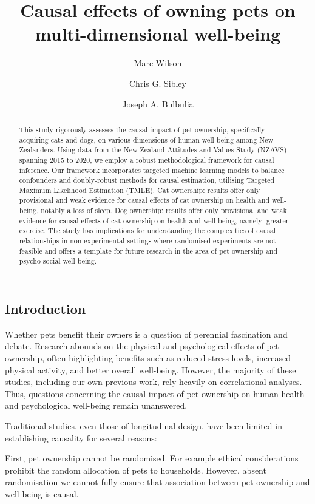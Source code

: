 \documentclass[
  singlecolumn,
  9pt]{article}
\title{Causal effects of owning pets on multi-dimensional well-being}
\author{Marc Wilson}
\affil{%
                  Victoria University of Wellington, New Zealand
              }
\author{Chris G. Sibley}
\affil{%
                  School of Psychology, University of Auckland
              }
\author{Joseph A. Bulbulia}
\affil{%
                  Victoria University of Wellington, New Zealand
              }
\date{}
\begin{document}
\maketitle
\begin{abstract}
This study rigorously assesses the causal impact of pet ownership,
specifically acquiring cats and dogs, on various dimensions of human
well-being among New Zealanders. Using data from the New Zealand
Attitudes and Values Study (NZAVS) spanning 2015 to 2020, we employ a
robust methodological framework for causal inference. Our framework
incorporates targeted machine learning models to balance confounders and
doubly-robust methods for causal estimation, utilising Targeted Maximum
Likelihood Estimation (TMLE). Cat ownership: results offer only
provisional and weak evidence for causal effects of cat ownership on
health and well-being, notably a loss of sleep. Dog ownership: results
offer only provisional and weak evidence for causal effects of cat
ownership on health and well-being, namely: greater exercise. The study
has implications for understanding the complexities of causal
relationships in non-experimental settings where randomised experiments
are not feasible and offers a template for future research in the area
of pet ownership and psycho-social well-being.
\end{abstract}
\subsection{Introduction}\label{introduction}

Whether pets benefit their owners is a question of perennial fascination
and debate. Research abounds on the physical and psychological effects
of pet ownership, often highlighting benefits such as reduced stress
levels, increased physical activity, and better overall well-being.
However, the majority of these studies, including our own previous work,
rely heavily on correlational analyses. Thus, questions concerning the
causal impact of pet ownership on human health and psychological
well-being remain unanswered.

Traditional studies, even those of longitudinal design, have been
limited in establishing causality for several reasons:

First, pet ownership cannot be randomised. For example ethical
considerations prohibit the random allocation of pets to households.
However, absent randomisation we cannot fully ensure that association
between pet ownership and well-being is causal.
\end{document}
